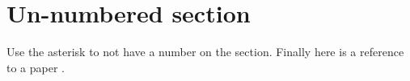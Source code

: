 \documentclass[10pt]{article}
\begin{document}
\section*{Un-numbered section}

Use the asterisk to not have a number on the section. Finally here is a reference to a paper \citep{Niem:Smit:Bank:test:2008}.



\end{document}

